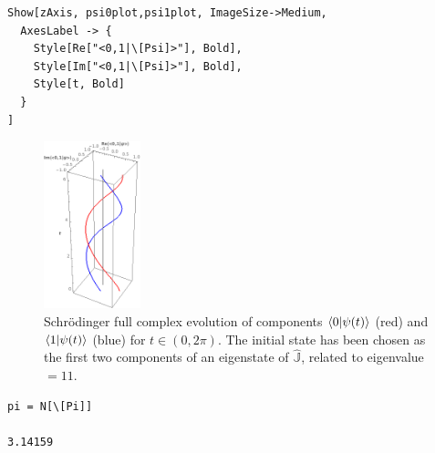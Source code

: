 \begin{Verbatim}
Show[zAxis, psi0plot,psi1plot, ImageSize->Medium,
  AxesLabel -> {
    Style[Re["<0,1|\[Psi]>"], Bold],
    Style[Im["<0,1|\[Psi]>"], Bold],
    Style[t, Bold]
  }
]
\end{Verbatim}
\begin{figure}[!h]
  \centering
  \includegraphics[width=0.25\textwidth]{img/qubit-evo-schrod.png}
  \caption[(from notebook)]{
    Schr{\"o}dinger full complex evolution of components
    $\braket{0}{\psi(t)}$ (red) and 
    $\braket{1}{\psi(t)}$ (blue) for
    $t \in (0, 2\pi) $. The initial state
    has been chosen as the first two components of an eigenstate of
    $\hat{\mathbb{J}}$, related to eigenvalue $= 11$.
  }
\end{figure}

\begin{Verbatim}
pi = N[\[Pi]]

3.14159
\end{Verbatim}

